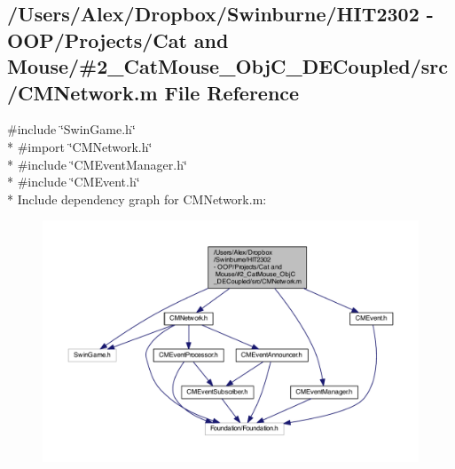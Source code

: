 \subsection{/\-Users/\-Alex/\-Dropbox/\-Swinburne/\-H\-I\-T2302 -\/ O\-O\-P/\-Projects/\-Cat and Mouse/\#2\-\_\-\-Cat\-Mouse\-\_\-\-Obj\-C\-\_\-\-D\-E\-Coupled/src/\-C\-M\-Network.m File Reference}
\label{_c_m_network_8m}
{\ttfamily \#include \char`\"{}Swin\-Game.\-h\char`\"{}}\\*
{\ttfamily \#import \char`\"{}C\-M\-Network.\-h\char`\"{}}\\*
{\ttfamily \#include \char`\"{}C\-M\-Event\-Manager.\-h\char`\"{}}\\*
{\ttfamily \#include \char`\"{}C\-M\-Event.\-h\char`\"{}}\\*
Include dependency graph for C\-M\-Network.\-m\-:
\nopagebreak
\begin{figure}[H]
\begin{center}
\leavevmode
\includegraphics[width=350pt]{_c_m_network_8m__incl}
\end{center}
\end{figure}
